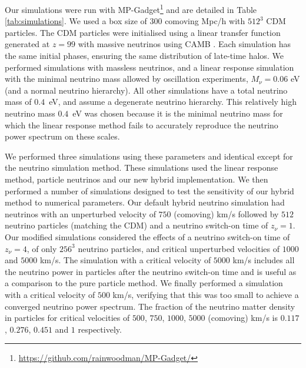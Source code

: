 \documentclass[useAMS, usenatbib]{mnras}
\begin{document}

%

Our simulations were run with MP-Gadget\footnote{\url{https://github.com/rainwoodman/MP-Gadget/}} and are detailed in Table \ref{tab:simulations}. We used a box size of $300$ comoving Mpc/h with $512^3$ CDM particles.
The CDM particles were initialised using a linear transfer function generated at $z=99$ with massive neutrinos using CAMB \citep{CAMB_neutrinos}. Each simulation has the same initial phases, ensuring the same distribution of late-time halos. We performed simulations with massless neutrinos, and a linear response simulation with the minimal neutrino mass allowed by oscillation experiments, $M_\nu = 0.06$ eV (and a normal neutrino hierarchy). All other simulations have a total neutrino mass of $0.4$~eV, and assume a degenerate neutrino hierarchy. This relatively high neutrino mass $0.4$~eV was chosen because it is the minimal neutrino mass for which the linear response method fails to accurately reproduce the neutrino power spectrum on these scales.

We performed three simulations using these parameters and identical except for the neutrino simulation method. These simulations used the linear response method, particle neutrinos and our new hybrid implementation. We then performed a number of simulations designed to test the sensitivity of our hybrid method to numerical parameters. Our default hybrid neutrino simulation had neutrinos with an unperturbed velocity of $750$ (comoving) km/s followed by $512$ neutrino particles (matching the CDM) and a neutrino switch-on time of $z_\nu = 1$. Our modified simulations considered the effects of a neutrino switch-on time of $z_\nu = 4$, of only $256^3$ neutrino particles, and critical unperturbed velocities of $1000$ and $5000$ km/s. The simulation with a critical velocity of $5000$ km/s includes all the neutrino power in particles after the neutrino switch-on time and is useful as a comparison to the pure particle method. We finally performed a simulation with a critical velocity of $500$ km/s, verifying that this was too small to achieve a converged neutrino power spectrum.
The fraction of the neutrino matter density in particles for critical velocities of $500$, $750$, $1000$, $5000$ (comoving) km/s is $0.117$, $0.276$, $0.451$ and $1$ respectively.
\end{document}
